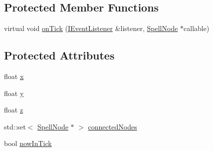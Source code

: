\subsection*{Protected Member Functions}
\begin{DoxyCompactItemize}
\item 
virtual void \hyperlink{class_spell_node_a0e8d39e7ebc6c7bd9e52eaf1be213af8}{on\-Tick} (\hyperlink{class_i_event_listener}{I\-Event\-Listener} \&listener, \hyperlink{class_spell_node}{Spell\-Node} $\ast$callable)
\end{DoxyCompactItemize}
\subsection*{Protected Attributes}
\begin{DoxyCompactItemize}
\item 
float \hyperlink{class_spell_node_a916f2a709a674dd2a61530b6acc339cc}{x}
\item 
float \hyperlink{class_spell_node_a754d80fd0fd82dbc12443b5f277b9fb4}{y}
\item 
float \hyperlink{class_spell_node_aff090331ff1bd816a22e974a50c1a180}{z}
\item 
std\-::set$<$ \hyperlink{class_spell_node}{Spell\-Node} $\ast$ $>$ \hyperlink{class_spell_node_a5073f68f588de6227430cb0abe3e161a}{connected\-Nodes}
\item 
bool \hyperlink{class_spell_node_a334bcdb7648ffd704510a6b277057fa5}{now\-In\-Tick}
\end{DoxyCompactItemize}


